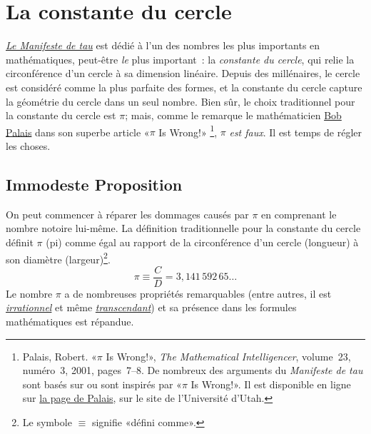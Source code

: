 \section{La constante du cercle} %
\label{sec:the_circle_constant}

\href{https://tauday.com/le_manifeste_de_tau}{\emph{Le Manifeste de tau}} est dédié
à l'un des nombres les plus importants en mathématiques, peut-être \emph{le}
plus important~: la \emph{constante du cercle}, qui relie la circonférence d'un
cercle à sa dimension linéaire. Depuis des millénaires, le cercle est considéré
comme la plus parfaite des formes, et la constante du cercle capture la
géométrie du cercle dans un seul nombre. Bien sûr, le choix traditionnel pour la
constante du cercle est $\pi$\ns; mais, comme le remarque le mathématicien
\href{https://translate.google.com/translate?sl=en&tl=fr&u=https://www.math.utah.edu/~palais/}{Bob
Palais} dans son superbe article
«\ns $\pi$ Is Wrong!\ns » \footnote{Palais, Robert. «\ns $\pi$ Is Wrong!\ns », \emph{The
Mathematical Intelligencer}, volume~23, numéro~3, 2001, pages~7--8. De nombreux
des arguments du \emph{Manifeste de tau} sont basés sur ou sont inspirés par
«\ns $\pi$ Is Wrong!\ns ». Il est disponible en ligne sur
\href{https://translate.google.com/translate?hl=&sl=en&tl=fr&u=https://www.math.utah.edu/~palais/pi.html}{la
page de Palais}, sur le site de l'Université d'Utah.},
$\pi$ \emph{est faux}. Il est temps de régler les choses.

  \subsection{Immodeste Proposition} %
  \label{sec:an_immodest_proposal}

On peut commencer à réparer les dommages causés par $\pi$ en comprenant le nombre
notoire lui-même. La définition traditionnelle pour la constante du cercle
définit $\pi$ (pi) comme égal au rapport de la circonférence d'un cercle
(longueur) à son diamètre (largeur)\ns\footnote{Le symbole $\equiv$ signifie
«\ns défini comme\ns ».}.
\begin{equation}
\label{eq:pi}
\pi \equiv \frac{C}{D} = 3{,}141\,592\,65\ldots
\end{equation}
Le nombre $\pi$ a de nombreuses propriétés remarquables (entre autres, il est
\href{https://fr.wikipedia.org/wiki/Nombre_irrationnel}{\emph{irrationnel}} et
même \href{https://fr.wikipedia.org/wiki/Nombre_transcendant}{\emph{transcendant}}) et
sa présence dans les formules mathématiques est répandue.

